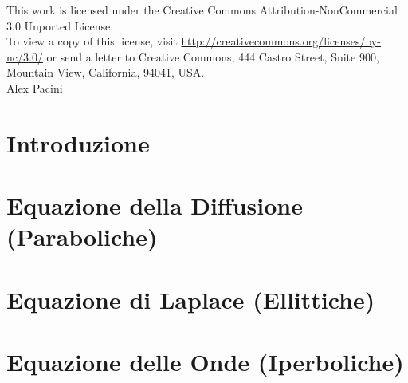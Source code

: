 \documentclass[a4paper]{report}
\begin{document}
%

%
\null
\vfill
%
	This work is licensed under the Creative Commons 
	Attribution-NonCommercial 3.0 Unported License.\\
	To view a copy of this license, visit 
	\url{http://creativecommons.org/licenses/by-nc/3.0/} or send a letter 
	to Creative Commons, 444 Castro Street, Suite 900, Mountain 
	View, California, 94041, USA.\\
	
	Alex Pacini
%
\newpage
\tableofcontents
\newpage
%
\chapter{Introduzione}	\label{chap:intro}

%
\chapter{Equazione della Diffusione (Paraboliche)}	\label{chap:diffusion}

%
\chapter{Equazione di Laplace (Ellittiche)}		\label{chap:laplacian}

%
\chapter{Equazione delle Onde (Iperboliche)}		\label{chap:waves}

%
\listoffigures
%
\end{document}
